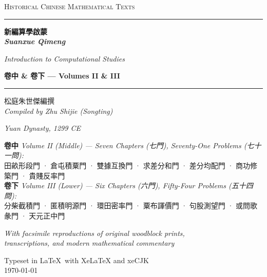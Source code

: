 \documentclass[11pt,a4paper]{article}
\newcommand{\longline}{\noindent\rule{\textwidth}{0.4pt}}
\begin{document}
\begin{titlepage}
\centering
\vspace*{2cm}

{\fontsize{14}{16}\selectfont\textsc{Historical Chinese Mathematical Texts}}
\vspace{1cm}

\longline
\vspace{1.5cm}

{\fontsize{28}{34}\selectfont\bfseries\color{titlecolor}
新編算學啟蒙\\[0.5cm]
\textit{Suanxue Qimeng}\\[0.3cm]
}
\vspace{0.5cm}

{\fontsize{18}{22}\selectfont\color{sectioncolor}
\textit{Introduction to Computational Studies}\\[0.8cm]
}

\vspace{0.3cm}
{\fontsize{16}{20}\selectfont\bfseries\color{chaptercolor}
卷中 \& 卷下 --- Volumes II \& III\\[0.3cm]
}

\vspace{1.5cm}
\longline
\vspace{1cm}

{\large 松庭朱世傑編撰\\[0.3cm]
\textit{Compiled by Zhu Shijie (Songting)}\\[0.5cm]
}

\vspace{0.5cm}

{\large\textit{Yuan Dynasty, 1299 CE}\\[0.3cm]
}

\vspace{1cm}

\begin{minipage}{0.85\textwidth}
\centering
\textbf{卷中} \textit{Volume II (Middle) --- Seven Chapters (七門), Seventy-One Problems (七十一問):}\\[0.3cm]
田畝形段門 · 倉屯積粟門 · 雙據互換門 · 求差分和門 · 差分均配門 · 商功修築門 · 貴賤反率門\\[0.6cm]
\textbf{卷下} \textit{Volume III (Lower) --- Six Chapters (六門), Fifty-Four Problems (五十四問):}\\[0.3cm]
分柴截積門 · 匿積明源門 · 環田密率門 · 粟布諢價門 · 句股測望門 · 或問歌彖門 · 天元正中門
\end{minipage}

\vfill

{\small\textit{With facsimile reproductions of original woodblock prints,}\\
\textit{transcriptions, and modern mathematical commentary}\\[0.5cm]
}

{\small Typeset in \LaTeX\ with \textsf{XeLaTeX} and \textup{xeCJK}\\
\today}

\end{titlepage}
\end{document}
